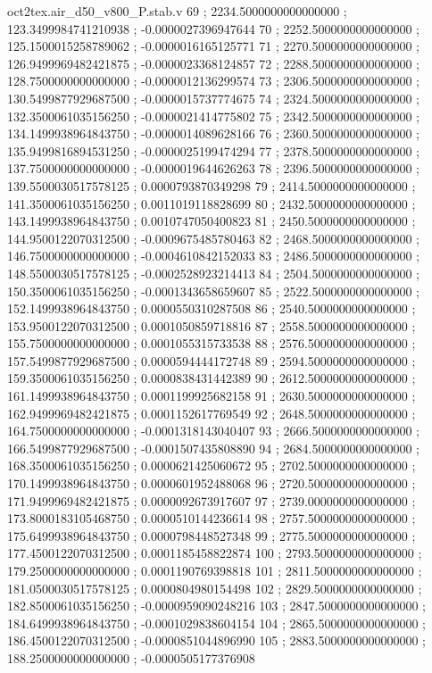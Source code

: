 \begin{filecontents}[overwrite]{oct2tex.air_d50_v800_P.stab.v}
69 ; 2234.5000000000000000 ; 123.3499984741210938 ; -0.0000027396947644
70 ; 2252.5000000000000000 ; 125.1500015258789062 ; -0.0000016165125771
71 ; 2270.5000000000000000 ; 126.9499969482421875 ; -0.0000023368124857
72 ; 2288.5000000000000000 ; 128.7500000000000000 ; -0.0000012136299574
73 ; 2306.5000000000000000 ; 130.5499877929687500 ; -0.0000015737774675
74 ; 2324.5000000000000000 ; 132.3500061035156250 ; -0.0000021414775802
75 ; 2342.5000000000000000 ; 134.1499938964843750 ; -0.0000014089628166
76 ; 2360.5000000000000000 ; 135.9499816894531250 ; -0.0000025199474294
77 ; 2378.5000000000000000 ; 137.7500000000000000 ; -0.0000019644626263
78 ; 2396.5000000000000000 ; 139.5500030517578125 ; 0.0000793870349298
79 ; 2414.5000000000000000 ; 141.3500061035156250 ; 0.0011019118828699
80 ; 2432.5000000000000000 ; 143.1499938964843750 ; 0.0010747050400823
81 ; 2450.5000000000000000 ; 144.9500122070312500 ; -0.0009675485780463
82 ; 2468.5000000000000000 ; 146.7500000000000000 ; -0.0004610842152033
83 ; 2486.5000000000000000 ; 148.5500030517578125 ; -0.0002528923214413
84 ; 2504.5000000000000000 ; 150.3500061035156250 ; -0.0001343658659607
85 ; 2522.5000000000000000 ; 152.1499938964843750 ; 0.0000550310287508
86 ; 2540.5000000000000000 ; 153.9500122070312500 ; 0.0001050859718816
87 ; 2558.5000000000000000 ; 155.7500000000000000 ; 0.0001055315733538
88 ; 2576.5000000000000000 ; 157.5499877929687500 ; 0.0000594444172748
89 ; 2594.5000000000000000 ; 159.3500061035156250 ; 0.0000838431442389
90 ; 2612.5000000000000000 ; 161.1499938964843750 ; 0.0001199925682158
91 ; 2630.5000000000000000 ; 162.9499969482421875 ; 0.0001152617769549
92 ; 2648.5000000000000000 ; 164.7500000000000000 ; -0.0001318143040407
93 ; 2666.5000000000000000 ; 166.5499877929687500 ; -0.0001507435808890
94 ; 2684.5000000000000000 ; 168.3500061035156250 ; 0.0000621425060672
95 ; 2702.5000000000000000 ; 170.1499938964843750 ; 0.0000601952488068
96 ; 2720.5000000000000000 ; 171.9499969482421875 ; 0.0000092673917607
97 ; 2739.0000000000000000 ; 173.8000183105468750 ; 0.0000510144236614
98 ; 2757.5000000000000000 ; 175.6499938964843750 ; 0.0000798448527348
99 ; 2775.5000000000000000 ; 177.4500122070312500 ; 0.0001185458822874
100 ; 2793.5000000000000000 ; 179.2500000000000000 ; 0.0001190769398818
101 ; 2811.5000000000000000 ; 181.0500030517578125 ; 0.0000804980154498
102 ; 2829.5000000000000000 ; 182.8500061035156250 ; -0.0000959090248216
103 ; 2847.5000000000000000 ; 184.6499938964843750 ; -0.0001029838604154
104 ; 2865.5000000000000000 ; 186.4500122070312500 ; -0.0000851044896990
105 ; 2883.5000000000000000 ; 188.2500000000000000 ; -0.0000505177376908

\end{filecontents}
